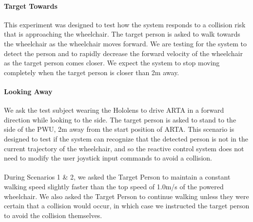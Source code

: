 \paragraph{Target Towards} This experiment was designed to test how the system responds to a collision risk that is approaching the wheelchair. The target person is asked to walk towards the wheelchair as the wheelchair moves forward. We are testing for the system to detect the person and to rapidly decrease the forward velocity of the wheelchair as the target person comes closer. We expect the system to stop moving completely when the target person is closer than 2m away.

\paragraph{Looking Away} We ask the test subject wearing the Hololens to drive ARTA in a forward direction while looking to the side. The target person is asked to stand to the side of the PWU, 2m away from the start position of ARTA. This scenario is designed to test if the system can recognize that the detected person is not in the current trajectory of the wheelchair, and so the reactive control system does not need to modify the user joystick input commands to avoid a collision.

\paragraph{} During Scenarios 1 \& 2, we asked the Target Person to maintain a constant walking speed slightly faster than the top speed of 1.0m/s of the powered wheelchair. We also asked the Target Person to continue walking unless they were certain that a collision would occur, in which case we instructed the target person to avoid the collision themselves.

